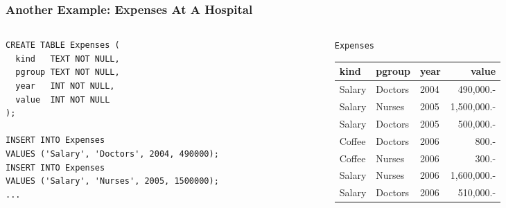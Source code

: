 \documentclass[dvipsnames]{beamer}
\begin{document}
\begin{frame}[fragile=singleslide]
\frametitle{Another Example: Expenses At A Hospital}

\begin{columns}[t]
  \begin{column}{.5\textwidth}
    \begin{footnotesize}
\begin{verbatim}
CREATE TABLE Expenses (
  kind   TEXT NOT NULL,
  pgroup TEXT NOT NULL,
  year   INT NOT NULL,
  value  INT NOT NULL
);

INSERT INTO Expenses
VALUES ('Salary', 'Doctors', 2004, 490000);
INSERT INTO Expenses
VALUES ('Salary', 'Nurses', 2005, 1500000);
...
\end{verbatim}
  \end{footnotesize}
\end{column}

  \begin{column}{.5\textwidth}
    \texttt{Expenses} \\
    \begin{footnotesize}
      \begin{tabular}{|l|l|l|r|}\hline
        kind     & pgroup        & year & value \\\hline
        Salary   & Doctors & 2004 & 490,000.- \\ 
        Salary   & Nurses       & 2005 & 1,500,000.- \\
        Salary   & Doctors & 2005 & 500,000.- \\
        Coffee   & Doctors & 2006 & 800.- \\
        Coffee   & Nurses       & 2006 & 300.- \\
        Salary   & Nurses       & 2006 & 1,600,000.- \\
        Salary   & Doctors & 2006 & 510,000.- \\
        \hline
      \end{tabular}
    \end{footnotesize}
  \end{column}
\end{columns}
\end{frame}
\end{document}
